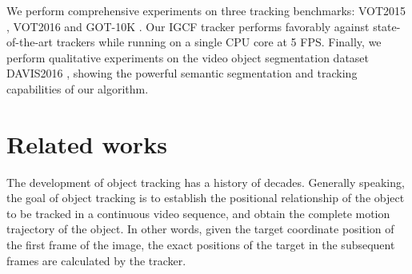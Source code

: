 \documentclass[review]{elsarticle}
\begin{document}
We perform comprehensive experiments on three tracking benchmarks: VOT2015 \cite{Kristan2015TheVO}, VOT2016 \cite{Kristan2016TheVO} and GOT-10K \cite{Huang2018GOT10kAL}. Our IGCF tracker performs favorably against state-of-the-art trackers while running on a single CPU core at 5 FPS. Finally, we perform qualitative experiments on the video object segmentation dataset DAVIS2016 \cite{Perazzi2016}, showing the powerful semantic segmentation and tracking capabilities of our algorithm.

\section{Related works}
The development of object tracking has a history of decades. Generally speaking, the goal of object tracking is to establish the positional relationship of the object to be tracked in a continuous video sequence, and obtain the complete motion trajectory of the object. In other words, given the target coordinate position of the first frame of the image, the exact positions of the target in the subsequent frames are calculated by the tracker. 
\end{document}

